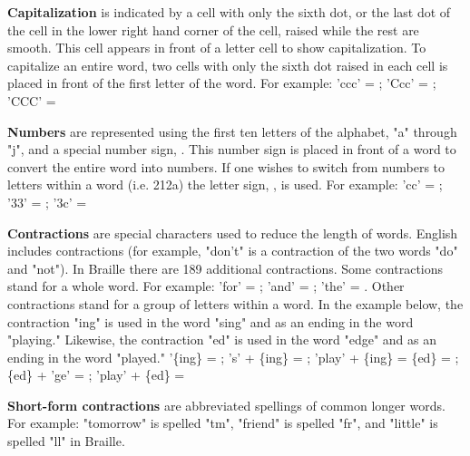 \documentclass[26pt]{article}
\begin{document}
\textbf{Capitalization} is indicated by a cell with only the sixth dot, or the last dot of the cell in the lower right hand corner of the cell, raised while the rest are smooth. This cell appears in front of a letter cell to show capitalization. To capitalize an entire word, two cells with only the sixth dot raised in each cell is placed in front of the first letter of the word. \newline For example:  'ccc' = ; 'Ccc' = ; 'CCC' =  \vspace{+10pt}

\textbf{Numbers} are represented using the first ten letters of the alphabet, "a" through "j", and a special number sign, . This number sign is placed in front of a word to convert the entire word into numbers. If one wishes to switch from numbers to letters within a word (i.e. 212a) the letter sign, , is used.  \newline For example: 'cc' = ; '33' = ; '3c' =  \vspace{+10pt}

\textbf{Contractions} are special characters used to reduce the length of words. English includes contractions (for example, "don't" is a contraction of the two words "do" and "not"). In Braille there are 189 additional contractions. Some contractions stand for a whole word. \newline For example: 'for' = ; 'and' = ; 'the' = . \vspace{+10pt} 
Other contractions stand for a group of letters within a word. In the example below, the contraction "ing" is used in the word "sing" and as an ending in the word "playing." Likewise, the contraction "ed" is used in the word "edge" and as an ending in the word "played." '\newline \{ing\} =  ; 's' + \{ing\} = ; 'play' + \{ing\} =  \newline \{ed\}  =  ; \{ed\} + 'ge' = ; 'play' + \{ed\} =  \vspace{+10pt}

\textbf{Short-form contractions} are abbreviated spellings of common longer words. For example: "tomorrow" is spelled "tm", "friend" is spelled "fr", and "little" is spelled "ll" in Braille.  \newline
\end{document}
